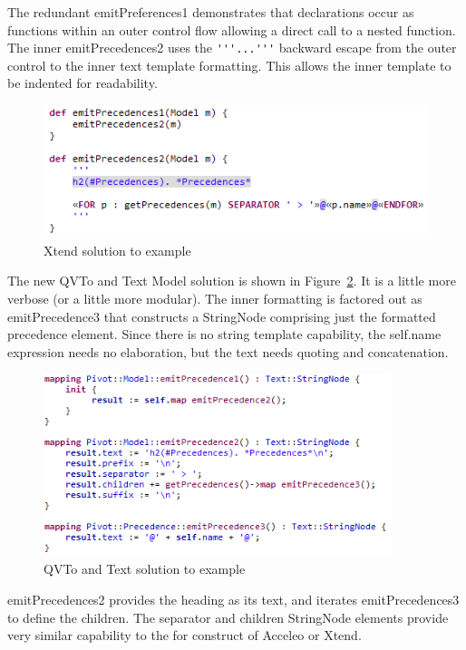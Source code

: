 \documentclass{llncs}
\begin{document}
The redundant emitPreferences1 demonstrates that declarations occur as functions within an outer control flow allowing a direct call to a nested function. The inner emitPrecedences2 uses the \verb|'''...'''| backward escape from the outer control to the inner text template formatting. This allows the inner template to be indented for readability.

\begin{figure}
	\begin{center}
		\includegraphics[width=4.5in]{XtendExample.png}
	\end{center}
	\caption{Xtend solution to example}
	\label{fig:XtendExample}
\end{figure}

The new QVTo and Text Model solution is shown in Figure~\ref{fig:QVToExample}. It is a little more verbose (or a little more modular). The inner formatting is factored out as emitPrecedence3 that constructs a StringNode comprising just the formatted precedence element. Since there is no string template capability, the self.name expression needs no elaboration, but the text needs quoting and concatenation. 

\begin{figure}
	\begin{center}
		\includegraphics[width=4.0in]{QVToExample.png}
	\end{center}
	\caption{QVTo and Text solution to example}
	\label{fig:QVToExample}
\end{figure}

emitPrecedences2 provides the heading as its text, and iterates emitPrecedences3 to define the children. The separator and children StringNode elements provide very similar capability to the for construct of Acceleo or Xtend. %
\end{document}

